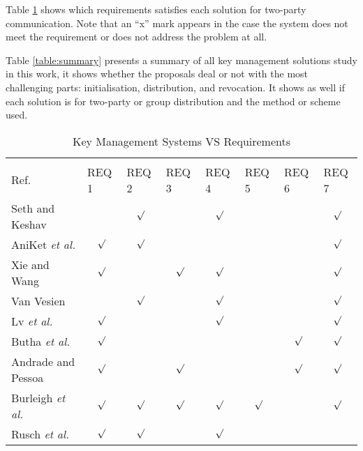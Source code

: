 Table \ref{table:summaryREQ} shows which requirements satisfies each solution for two-party communication. Note that an ``x'' mark appears in the case the system does not meet the requirement or does not address the problem at all.    


Table \ref{table:summary} presents a summary of all key management solutions study in this work, it shows whether the proposals deal or not with the most challenging parts: initialisation, distribution, and revocation. It shows as well if each solution is for two-party or group distribution and the method or scheme used.  





\begin{table}[hbt]
\begin{tabular}{@{}lccccccc@{}}
 & \multicolumn{7}{l}{\cellcolor[HTML]{000000}{\color[HTML]{EFEFEF} key Management Requirement}} \\
 Ref. & \multicolumn{1}{l}{\cellcolor[HTML]{C0C0C0}REQ 1} & \multicolumn{1}{l}{\cellcolor[HTML]{C0C0C0}REQ 2} & \multicolumn{1}{l}{\cellcolor[HTML]{C0C0C0}REQ 3} & \multicolumn{1}{l}{\cellcolor[HTML]{C0C0C0}REQ 4} & \multicolumn{1}{l}{\cellcolor[HTML]{C0C0C0}REQ 5} & \multicolumn{1}{l}{\cellcolor[HTML]{C0C0C0}REQ 6} & \multicolumn{1}{l}{\cellcolor[HTML]{C0C0C0}REQ 7} \\
\cellcolor[HTML]{C0C0C0}Seth and Keshav \cite{seth2005practical}  &  & $\surd$ &  & $\surd$ &  &  & $\surd$ \\
\hline
\cellcolor[HTML]{C0C0C0}AniKet \textit{et al.} \cite{kate2007anonymity} & $\surd$ & $\surd$ &   &   &  &  & $\surd$ \\
\hline
\cellcolor[HTML]{C0C0C0}Xie and Wang \cite{xie2013practical} & $\surd$ & & $\surd$  & $\surd$  & &  & $\surd$ \\
\hline
\cellcolor[HTML]{C0C0C0}Van Vesien \cite{van2010dynamic}  & & $\surd$ & & $\surd$  & & & $\surd$ \\
\hline
\cellcolor[HTML]{C0C0C0}Lv \textit{et al.} \cite{lv2014non} & $\surd$ &  &  & $\surd$  &  &  & $\surd$ \\
\hline
\cellcolor[HTML]{C0C0C0}Butha \textit{et al.} \cite{bhutta2014efficient} & $\surd$ & & &  & & $\surd$ & $\surd$ \\
\hline
\cellcolor[HTML]{C0C0C0}Andrade and Pessoa \cite{de2016fully} & $\surd$ &  & $\surd$  &  & & $\surd$ & $\surd$ \\
\hline
\cellcolor[HTML]{C0C0C0}Burleigh \textit{et al.} \cite{burleigh-dtnwg-dtka-01}   & $\surd$   & $\surd$   & $\surd$ & $\surd$ & $\surd$  &  & $\surd$  \\
\hline
\cellcolor[HTML]{C0C0C0}R{u}sch \textit{et al.}\cite{rusch2017forward}   & $\surd$  & $\surd$ &  & $\surd$ &  &  &   \\
\hline
\end{tabular}
\caption{Key Management Systems VS Requirements}
\label{table:summaryREQ}
\end{table}



